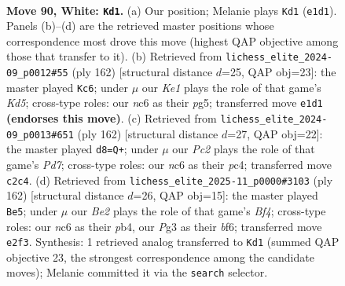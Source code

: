 \documentclass[11pt]{article}
\begin{document}
\clearpage

\begin{figure}[p]\centering
\begin{subfigure}{0.46\textwidth}\centering
\resizebox{\linewidth}{!}{%
\newchessgame
\chessboard[
  setfen={r7/3k4/P1n5/8/8/1R4PP/2P1B3/4K3 w - - 13 90},
  showmover=false,
  pgfstyle=straightmove, color=movearrow, markmove={e1-d1}
]}
\caption{}
\end{subfigure}\hfill
\begin{subfigure}{0.46\textwidth}\centering
\resizebox{\linewidth}{!}{%
\newchessgame
\chessboard[
  setfen={1r6/2R5/1P1P4/2BK1kp1/8/8/8/8 w - - 0 82},
  showmover=false,
  pgfstyle=straightmove, color=movearrow, markmove={d5-c6}
]}
\caption{}
\end{subfigure}
\\[4pt]
\begin{subfigure}{0.46\textwidth}\centering
\resizebox{\linewidth}{!}{%
\newchessgame
\chessboard[
  setfen={6k1/3P4/8/7P/2pB1K2/2P4r/8/8 w - - 0 82},
  showmover=false,
  pgfstyle=straightmove, color=movearrow, markmove={d7-d8}
]}
\caption{}
\end{subfigure}\hfill
\begin{subfigure}{0.46\textwidth}\centering
\resizebox{\linewidth}{!}{%
\newchessgame
\chessboard[
  setfen={2R5/3P4/1k3b2/8/1p2PB2/1P3K2/p7/4r3 w - - 0 82},
  showmover=false,
  pgfstyle=straightmove, color=movearrow, markmove={f4-e5}
]}
\caption{}
\end{subfigure}
\caption{\textbf{Move 90, White: \texttt{Kd1}.} (a) Our position; Melanie plays \texttt{Kd1} (\texttt{e1d1}). Panels (b)--(d) are the retrieved master positions whose correspondence most drove this move (highest QAP objective among those that transfer to it). (b) Retrieved from \texttt{lichess\_elite\_2024-09\_p0012\#55} (ply 162) [structural distance $d$=25, QAP obj=23]: the master played \texttt{Kc6}; under $\mu$ our \emph{Ke1} plays the role of that game's \emph{Kd5}; cross-type roles: our \emph{n}c6 as their \emph{p}g5; transferred move \texttt{e1d1} \textbf{(endorses this move)}. (c) Retrieved from \texttt{lichess\_elite\_2024-09\_p0013\#651} (ply 162) [structural distance $d$=27, QAP obj=22]: the master played \texttt{d8=Q+}; under $\mu$ our \emph{Pc2} plays the role of that game's \emph{Pd7}; cross-type roles: our \emph{n}c6 as their \emph{p}c4; transferred move \texttt{c2c4}. (d) Retrieved from \texttt{lichess\_elite\_2025-11\_p0000\#3103} (ply 162) [structural distance $d$=26, QAP obj=15]: the master played \texttt{Be5}; under $\mu$ our \emph{Be2} plays the role of that game's \emph{Bf4}; cross-type roles: our \emph{n}c6 as their \emph{p}b4, our \emph{P}g3 as their \emph{b}f6; transferred move \texttt{e2f3}. Synthesis: 1 retrieved analog transferred to \texttt{Kd1} (summed QAP objective 23, the strongest correspondence among the candidate moves); Melanie committed it via the \texttt{search} selector.}
\label{fig:thought-m178}
\end{figure}
\end{document}
